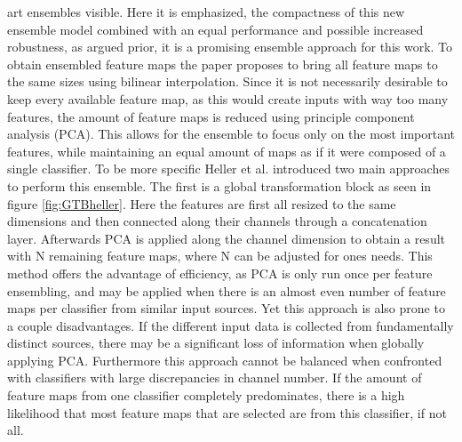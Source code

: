 art ensembles visible. Here it is emphasized, the compactness of this new ensemble model combined with an equal performance and possible 
increased robustness, as argued prior, it is a promising ensemble approach for this work.\newline
To obtain ensembled feature maps the paper proposes to bring all feature maps to the same sizes using bilinear interpolation. Since 
it is not necessarily desirable to keep every available feature map, as this would create inputs with way too many features, the amount of feature 
maps is reduced using principle component analysis (PCA). This allows for the ensemble to focus only on the most important features, while maintaining 
an equal amount of maps as if it were composed of a single classifier. To be more specific Heller et al. \cite{EnsembleHeller2023} introduced two main 
approaches to perform this ensemble. The first is a global transformation block as seen in figure \ref{fig:GTBheller}. 
Here the features are first all resized to the same dimensions and then connected along their channels through a concatenation layer.
Afterwards PCA is applied along the channel dimension to obtain a result with N remaining feature maps, where N can be adjusted for ones 
needs. This method offers the advantage of efficiency, as PCA is only run once per feature ensembling, and may be applied when there is 
an almost even number of feature maps per classifier from similar input sources. Yet this approach is also 
prone to a couple disadvantages. If the different input data is collected from fundamentally distinct sources, there may be a significant 
loss of information when globally applying PCA. Furthermore this approach cannot be balanced when confronted with classifiers with large 
discrepancies in channel number. If the amount of feature maps from one classifier completely predominates, there is a high likelihood 
that most feature maps that are selected are from this classifier, if not all.

